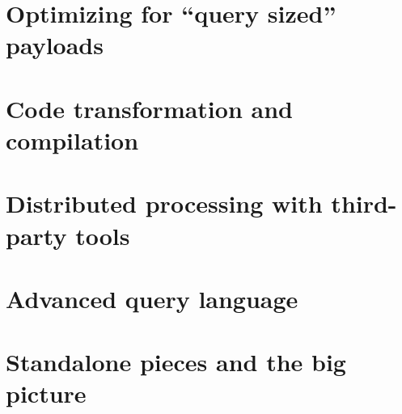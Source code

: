 \documentclass[a4paper]{jpconf}
\begin{document}
\section{Optimizing for ``query sized'' payloads}

\section{Code transformation and compilation}

\section{Distributed processing with third-party tools}

\section{Advanced query language}

\section{Standalone pieces and the big picture}
\end{document}
